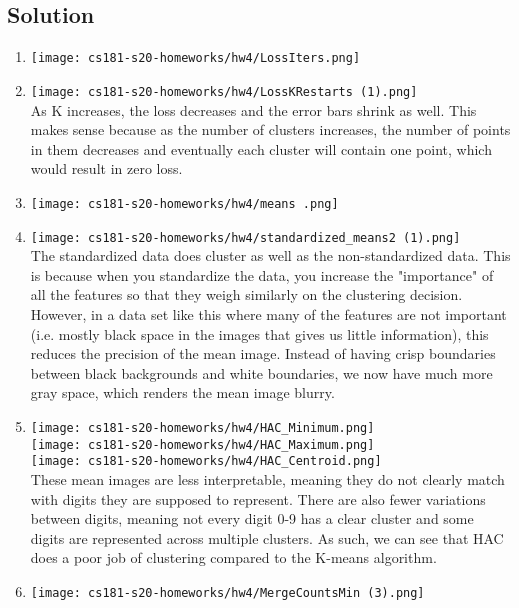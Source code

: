 \documentclass[submit]{harvardml}
\begin{document}
\subsection*{Solution}
\begin{enumerate}
    \item \texttt{[image: cs181-s20-homeworks/hw4/LossIters.png]}\\
    \item \texttt{[image: cs181-s20-homeworks/hw4/LossKRestarts (1).png]}\\
    As K increases, the loss decreases and the error bars shrink as well. This makes sense because as the number of clusters increases, the number of points in them decreases and eventually each cluster will contain one point, which would result in zero loss.
    \item \texttt{[image: cs181-s20-homeworks/hw4/means .png]}\\
    \item \texttt{[image: cs181-s20-homeworks/hw4/standardized\_means2 (1).png]} \\
    The standardized data does cluster as well as the non-standardized data. This is because when you standardize the data, you increase the "importance" of all the features so that they weigh similarly on the clustering decision. However, in a data set like this where many of the features are not important (i.e. mostly black space in the images that gives us little information), this reduces the precision of the mean image. Instead of having crisp boundaries between black backgrounds and white boundaries, we now have much more gray space, which renders the mean image blurry.\\
    \item
    \texttt{[image: cs181-s20-homeworks/hw4/HAC\_Minimum.png]}\\
    \texttt{[image: cs181-s20-homeworks/hw4/HAC\_Maximum.png]} \\
    \texttt{[image: cs181-s20-homeworks/hw4/HAC\_Centroid.png]} \\
    These mean images are less interpretable, meaning they do not clearly match with digits they are supposed to represent. There are also fewer variations between digits, meaning not every digit 0-9 has a clear cluster and some digits are represented across multiple clusters. As such, we can see that HAC does a poor job of clustering compared to the K-means algorithm.
    \item \texttt{[image: cs181-s20-homeworks/hw4/MergeCountsMin (3).png]}\\

\end{enumerate}
\end{document}
